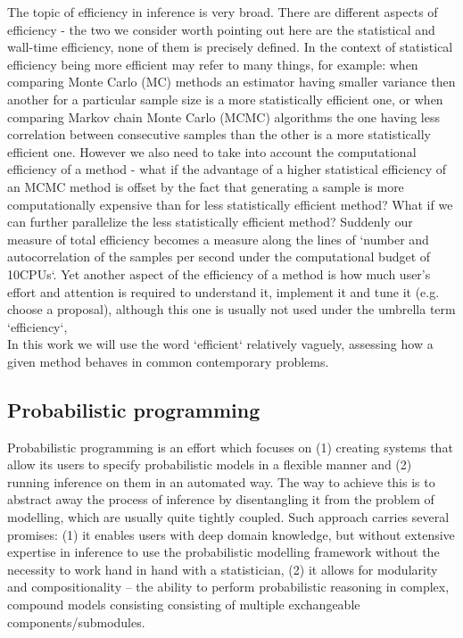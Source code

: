 \documentclass[12pt]{article}
\begin{document}
The topic of efficiency in inference is very broad.
There are different aspects of efficiency - the two we consider worth pointing out here are the statistical and wall-time efficiency,
none of them is precisely defined.
In the context of statistical efficiency being more efficient may refer to many things, for example: 
when comparing Monte Carlo (MC) methods an estimator having smaller variance then another for a particular sample size is a more statistically efficient one, or
when comparing Markov chain Monte Carlo (MCMC) algorithms the one having less correlation between consecutive samples than the other is a more statistically efficient one.
However we also need to take into account the computational efficiency of a method - what if the advantage of a higher statistical efficiency of an MCMC method is offset by the fact that generating a sample is more computationally expensive than for less statistically efficient method?
What if we can further parallelize the less statistically efficient method?
Suddenly our measure of total efficiency becomes a measure along the lines of `number and autocorrelation of the samples per second under the computational budget of 10CPUs`.
Yet another aspect of the efficiency of a method is how much user's effort and attention is required to understand it, implement it and tune it (e.g. choose a proposal), although this one is usually not used under the umbrella term `efficiency`,\\
In this work we will use the word `efficient` relatively vaguely, assessing how a given method behaves in common contemporary problems.




\subsection{Probabilistic programming}
Probabilistic programming is an effort which focuses on 
(1) creating systems that allow its users to specify probabilistic models in a flexible manner 
and 
(2) running inference on them in an automated way.
The way to achieve this is to abstract away the process of inference by disentangling it from the problem of modelling, which are usually quite tightly coupled.
Such approach carries several promises:
(1) it enables users with deep domain knowledge, but without extensive expertise in inference to use the probabilistic modelling framework without the necessity to work hand in hand with a statistician,
(2) it allows for modularity and compositionality -- the ability to perform probabilistic reasoning in complex, compound models consisting consisting of multiple exchangeable components/submodules.
\end{document}
